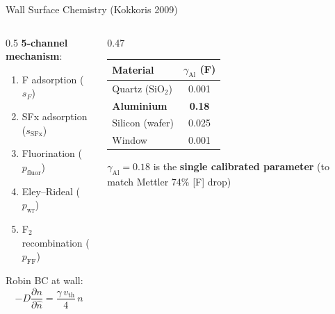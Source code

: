 \documentclass[aspectratio=169,10pt]{beamer}
\begin{document}
\begin{frame}{Wall Surface Chemistry (Kokkoris 2009)}
  \begin{columns}[T]
    \begin{column}{0.5\textwidth}
      \textbf{5-channel mechanism}:
      \begin{enumerate}[]
        \item F adsorption ($s_F$)
        \item SFx adsorption ($s_{\text{SFx}}$)
        \item Fluorination ($p_\text{fluor}$)
        \item Eley--Rideal ($p_\text{wr}$)
        \item F$_2$ recombination ($p_\text{FF}$)
      \end{enumerate}
      \vspace{0.2cm}
      Robin BC at wall:
      \[
        -D\frac{\partial n}{\partial \hat{n}} = \frac{\gamma\,v_\text{th}}{4}\,n
      \]
    \end{column}
    \begin{column}{0.47\textwidth}
      \centering
      \footnotesize
      \begin{tabular}{@{}lc@{}}
        \toprule
        Material & $\gamma_\text{Al}$ (F) \\
        \midrule
        Quartz (SiO$_2$) & 0.001 \\
        \textbf{Aluminium} & \textbf{0.18} \\
        Silicon (wafer) & 0.025 \\
        Window & 0.001 \\
        \bottomrule
      \end{tabular}
      \vspace{0.3cm}
      \normalsize
      $\gamma_\text{Al} = 0.18$ is the \textbf{single calibrated parameter}
      (to match Mettler 74\% [F] drop)
    \end{column}
  \end{columns}
\end{frame}
\end{document}
